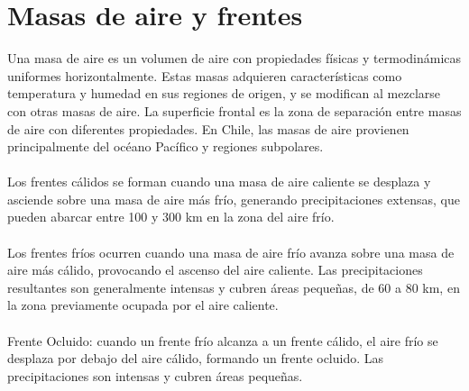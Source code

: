 \section{Masas de aire y frentes}

Una masa de aire es un volumen de aire con propiedades físicas y termodinámicas uniformes horizontalmente. Estas masas adquieren características como temperatura y humedad en sus regiones de origen, y se modifican al mezclarse con otras masas de aire. La superficie frontal es la zona de separación entre masas de aire con diferentes propiedades. En Chile, las masas de aire provienen principalmente del océano Pacífico y regiones subpolares.
\\\\
Los frentes cálidos se forman cuando una masa de aire caliente se desplaza y asciende sobre una masa de aire más frío, generando precipitaciones extensas, que pueden abarcar entre 100 y 300 km en la zona del aire frío.
\\\\
Los frentes fríos ocurren cuando una masa de aire frío avanza sobre una masa de aire más cálido, provocando el ascenso del aire caliente. Las precipitaciones resultantes son generalmente intensas y cubren áreas pequeñas, de 60 a 80 km, en la zona previamente ocupada por el aire caliente.
\\\\
Frente Ocluido: cuando un frente frío alcanza a un frente cálido, el aire frío se desplaza por debajo del aire cálido, formando un frente ocluido. Las precipitaciones son intensas y cubren áreas pequeñas.



